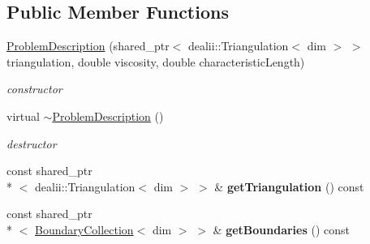 \subsection*{Public Member Functions}
\begin{DoxyCompactItemize}
\item 
\hypertarget{classnatrium_1_1ProblemDescription_aae378c7eb216b616de56dfcd162c02c2}{\hyperlink{classnatrium_1_1ProblemDescription_aae378c7eb216b616de56dfcd162c02c2}{Problem\-Description} (shared\-\_\-ptr$<$ dealii\-::\-Triangulation$<$ dim $>$ $>$ triangulation, double viscosity, double characteristic\-Length)}\label{classnatrium_1_1ProblemDescription_aae378c7eb216b616de56dfcd162c02c2}

\begin{DoxyCompactList}\small\item\em constructor \end{DoxyCompactList}\item 
\hypertarget{classnatrium_1_1ProblemDescription_a5270994970ddbd9f6fc98f292c1ccc0e}{virtual \hyperlink{classnatrium_1_1ProblemDescription_a5270994970ddbd9f6fc98f292c1ccc0e}{$\sim$\-Problem\-Description} ()}\label{classnatrium_1_1ProblemDescription_a5270994970ddbd9f6fc98f292c1ccc0e}

\begin{DoxyCompactList}\small\item\em destructor \end{DoxyCompactList}\item 
\hypertarget{classnatrium_1_1ProblemDescription_a69d3b6c08733468e6c9c152ce4f83585}{const shared\-\_\-ptr\\*
$<$ dealii\-::\-Triangulation$<$ dim $>$ $>$ \& {\bfseries get\-Triangulation} () const }\label{classnatrium_1_1ProblemDescription_a69d3b6c08733468e6c9c152ce4f83585}

\item 
\hypertarget{classnatrium_1_1ProblemDescription_abb061fe78c8d289fe2a4a9000015d842}{const shared\-\_\-ptr\\*
$<$ \hyperlink{classnatrium_1_1BoundaryCollection}{Boundary\-Collection}$<$ dim $>$ $>$ \& {\bfseries get\-Boundaries} () const }\label{classnatrium_1_1ProblemDescription_abb061fe78c8d289fe2a4a9000015d842}


\end{DoxyCompactItemize}
